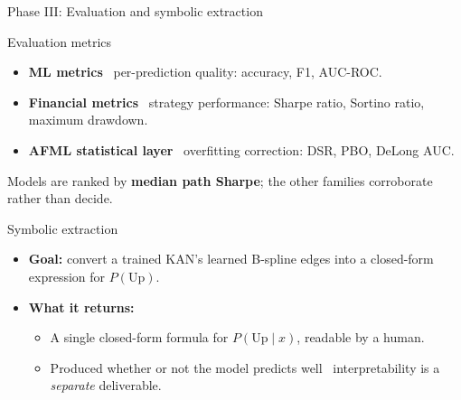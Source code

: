\documentclass[aspectratio=169, t]{beamer}
\begin{document}
\begin{frame}{Phase III: Evaluation and symbolic extraction}
\vspace{-0.4em}

{
\begin{block}{Evaluation metrics}
\footnotesize
\begin{itemize}\setlength{\itemsep}{3pt}
  \item \textbf{ML metrics} \textemdash\ per-prediction quality: accuracy, F1, AUC-ROC.
  \item \textbf{Financial metrics} \textemdash\ strategy performance: Sharpe ratio, Sortino ratio, maximum drawdown.
  \item \textbf{AFML statistical layer} \textemdash\ overfitting correction: DSR, PBO, DeLong AUC.
\end{itemize}
\vspace{0.2em}
{\scriptsize Models are ranked by \textbf{median path Sharpe}; the other families corroborate rather than decide.}
\end{block}
}

\vspace{0.8em}

{
\begin{block}{Symbolic extraction}
\footnotesize
\begin{itemize}\setlength{\itemsep}{3pt}
  \item \textbf{Goal:} convert a trained KAN's learned B-spline edges into a closed-form expression for $P(\mathrm{Up})$.
  \item \textbf{What it returns:}
  \begin{itemize}\setlength{\itemsep}{2pt}
    \item A single closed-form formula for $P(\mathrm{Up} \mid x)$, readable by a human.
    \item Produced whether or not the model predicts well \textemdash\ interpretability is a \emph{separate} deliverable.
  \end{itemize}
\end{itemize}
\end{block}
}

\end{frame}
\end{document}
